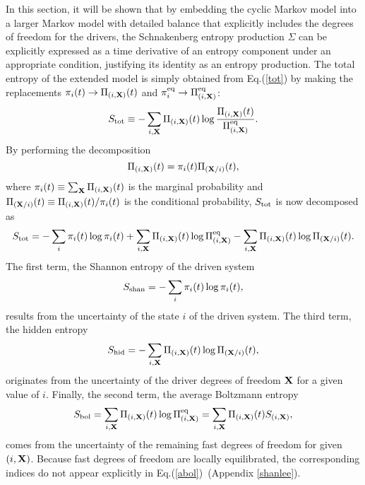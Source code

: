 \documentclass[aps,pre,amsmath,amssymb,floatfix,preprint,nofootinbib]{revtex4}
\begin{document}
In this section, it will be shown that by embedding the cyclic Markov model into a larger Markov model with detailed balance that explicitly includes the degrees of freedom for the drivers, the Schnakenberg entropy production $\Sigma$ can be explicitly expressed as a time derivative of an entropy component under an appropriate condition, justifying its identity as an entropy production. The total entropy of the extended model is simply obtained from Eq.(\ref{tot}) by making the replacements $\pi_i(t) \to \Pi_{(i,{\bf X})}(t)$ and $\pi^{\rm eq}_i \to \Pi^{\rm eq}_{(i,{\bf X})}$: 
\begin{equation}
S_{\rm tot}\equiv -\sum_{i,{\bf X}}  \Pi_{(i,{\bf X})}(t)\log \frac{\Pi_{(i,{\bf X})}(t)}{\Pi^{\rm eq}_{(i,{\bf X})}}
. \label{clex}
\end{equation}
By performing the decomposition 
\begin{equation}
\Pi_{(i,{\bf X})}(t) = \pi_i (t) \Pi_{({\bf X}/i)}(t) ,
\end{equation}
where  $\pi_i(t) \equiv \sum_{\bf X} \Pi_{(i,{\bf X})}(t)$ is the marginal probability and $\Pi_{({\bf X}/i)}(t) \equiv \Pi_{(i,{\bf X})}(t)/\pi_i(t)$ is the conditional probability, $S_{\rm tot}$  is now decomposed as
\begin{equation}
S_{\rm tot} =  -\sum_i \pi_i(t) \log \pi_i(t) + \sum_{i,{\bf X}} \Pi_{(i,{\bf X})}(t) \log \Pi^{\rm eq}_{(i,{\bf X})} -\sum_{i,{\bf X}} \Pi_{(i,{\bf X})}(t)  \log \Pi_{({\bf X}/i)}(t). \label{dcmp1}
\end{equation}
The first term, the Shannon entropy of the driven system
\begin{equation}
S_{\rm shan} = -\sum_i \pi_i(t) \log \pi_i(t), \label{shan1}
\end{equation}
results from the uncertainty of the state $i$ of the driven system.
The third term, the hidden entropy
\begin{equation}
S_{\rm hid} =  -\sum_{i,{\bf X}} \Pi_{(i,{\bf X})}(t)  \log \Pi_{({\bf X}/i)}(t), \label{hid1}
\end{equation}
originates from the uncertainty of the driver degrees of freedom ${\bf X}$ for a given value of $i$.
Finally, the second term, the average Boltzmann entropy
\begin{equation}
S_{\rm bol} =    \sum_{i,{\bf X}} \Pi_{(i,{\bf X})}(t) \log \Pi^{\rm eq}_{(i,{\bf X})}= \sum_{i,{\bf X}} \Pi_{(i,{\bf X})}(t) S_{(i,{\bf X})},\label{abol}
\end{equation}
comes from the uncertainty of the remaining fast degrees of freedom for given $(i,{\bf X})$. Because fast degrees of freedom are locally equilibrated, the corresponding indices do not appear explicitly in  Eq.(\ref{abol})~\cite{lee}(Appendix \ref{shanlee}). 
\end{document}

